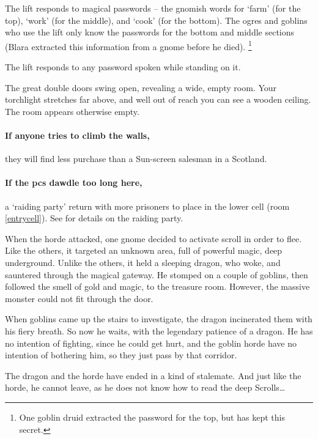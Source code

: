 The lift responds to magical passwords -- the gnomish words for `farm' (for the top), `work' (for the middle), and `cook' (for the bottom).
The \glspl{ogre} and goblins who use the lift only know the passwords for the bottom and middle sections (Blara extracted this information from a gnome before he died).%
\footnote{One goblin druid extracted the password for the top, but has kept this secret.}

The lift responds to any password spoken while standing on it.

\begin{boxtext}
  The great double doors swing open, revealing a wide, empty room.
  Your torchlight stretches far above, and well out of reach you can see a wooden ceiling.
  The room appears otherwise empty.
\end{boxtext}

\paragraph{If anyone tries to climb the walls,}
they will find less purchase than a Sun-screen salesman in a Scotland.

\paragraph{If the \glspl{pc} dawdle too long here,}
a `raiding party' return with more prisoners to place in the lower cell (room \ref{entrycell}).
See  for details on the raiding party.


\begin{exampletext}
  When the horde attacked, one gnome decided to activate  scroll in order to flee.
  Like the others, it targeted an unknown area, full of powerful magic, deep underground.
  Unlike the others, it held a sleeping dragon, who woke, and sauntered through the magical gateway.
  He stomped on a couple of goblins, then followed the smell of gold and magic, to the treasure room.
  However, the massive monster could not fit through the door.

  When goblins came up the stairs to investigate, the dragon incinerated them with his fiery breath.
  So now he waits, with the legendary patience of a dragon.
  He has no intention of fighting, since he could get hurt, and the goblin horde have no intention of bothering him, so they just pass by that corridor.

  The dragon and the horde have ended in a kind of stalemate.
  And just like the horde, he cannot leave, as he does not know how to read the \Gls{deep} Scrolls\ldots
\end{exampletext}

